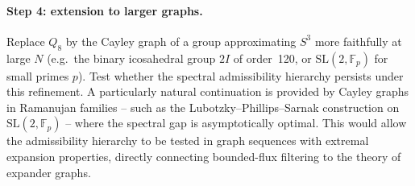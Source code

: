 \documentclass[11pt,a4paper]{article}
\begin{document}
  \paragraph{Step 4: extension to larger graphs.}
    Replace $Q_8$ by the Cayley graph of a group approximating $S^3$ more faithfully
    at large $N$ (e.g.\ the binary icosahedral group $2I$ of order~120, or
    $\mathrm{SL}(2, \mathbb{F}_p)$ for small primes $p$).
    Test whether the spectral admissibility hierarchy persists under this refinement.
    A particularly natural continuation is provided by Cayley graphs in Ramanujan
    families -- such as the Lubotzky--Phillips--Sarnak construction on
    $\mathrm{SL}(2, \mathbb{F}_p)$ -- where the spectral gap is asymptotically optimal.
    This would allow the admissibility hierarchy to be tested in graph sequences with
    extremal expansion properties, directly connecting bounded-flux filtering to the
    theory of expander graphs.
\end{document}
